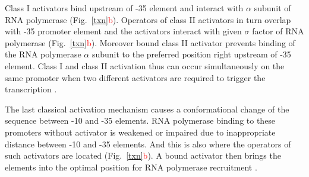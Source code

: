 Class I activators bind upstream of -35 element and interact with $\alpha$ subunit of RNA polymerase \cite{ushida1990helical} (Fig.~\ref{txn}\textcolor{red}{b}).
Operators of class II activators in turn overlap with -35 promoter element and the activators interact with given $\sigma$ factor of RNA polymerase \cite{igarashi1991functional} (Fig.~\ref{txn}\textcolor{red}{b}).
Moreover bound class II activator prevents binding of the RNA polymerase $\alpha$ subunit to the preferred position right upstream of -35 element.
Class I and class II activation thus can occur simultaneously on the same promoter when two different activators are required to trigger the transcription \cite{lloyd2002requirement}.

The last classical activation mechanism causes a conformational change of the sequence between -10 and -35 elements.
RNA polymerase binding to these promoters without activator is weakened or impaired due to inappropriate distance between -10 and -35 elements.
And this is also where the operators of such activators are located (Fig.~\ref{txn}\textcolor{red}{b}).
A bound activator then brings the elements into the optimal position for RNA polymerase recruitment \cite{heldwein2001crystal}.


